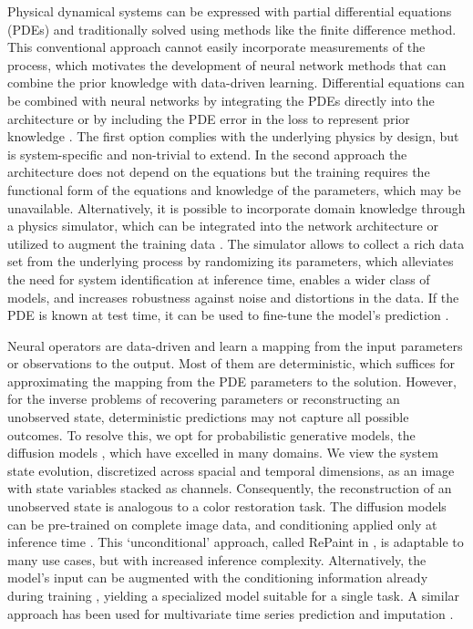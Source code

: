 \documentclass{article}
\begin{document}
Physical dynamical systems can be expressed with partial differential equations (PDEs) and traditionally solved using methods like the finite difference method. This conventional approach cannot easily incorporate measurements of the process, which motivates the development of neural network methods that can combine the prior knowledge with data-driven learning.
Differential equations can be combined with neural networks by integrating the PDEs directly into the architecture
\cite{greydanus2019hamiltonian, haitsiukevich2021agrid}
or by including the PDE error in the loss to represent prior knowledge 
\cite{raissi2019pinn}.
The first option complies with the underlying physics by design, but is system-specific and non-trivial to extend. In the second approach the architecture does not depend on the equations but the training requires the functional form of the equations and knowledge of the parameters, which may be unavailable.
Alternatively,  it is possible to incorporate domain knowledge through a physics simulator, which can be integrated into the network architecture \cite{yang2022learning} or utilized to augment the training data \cite{lam2023learning}.
The simulator allows to collect a rich data set from the underlying process by randomizing its parameters, which alleviates the need for system identification at inference time, enables a wider class of models, and increases robustness against noise and distortions in the data. If the PDE is known at test time, it can be used to fine-tune the model's prediction \cite{li2021physics}.  

Neural operators are data-driven and learn a mapping from the input parameters or observations to the output. Most of them are deterministic, which suffices for approximating the mapping from the PDE parameters to the solution. However, for the inverse problems of recovering parameters or reconstructing an unobserved state, deterministic predictions may not capture all possible outcomes. To resolve this, we opt for probabilistic generative models, the diffusion models \cite{sohl2015deep, ho2020denoising}, which have excelled in many domains. 
We view the system state evolution, discretized across spacial and temporal dimensions, as an image with state variables stacked as channels. Consequently, the reconstruction of an unobserved state is analogous to a color restoration task. The diffusion models can be pre-trained on complete image data, and conditioning applied only at inference time \cite{lugmayr2022repaint}.
This `unconditional' approach, called RePaint in \cite{lugmayr2022repaint}, is adaptable to many use cases, but with increased inference complexity. Alternatively, the model's input can be augmented with the conditioning information already during training \cite{saharia2022palette, yang2023uni}, yielding a specialized model suitable for a single task. A similar approach has been used for multivariate time series prediction and imputation \cite{alcaraz2023diffusionbased}. 
\end{document}
